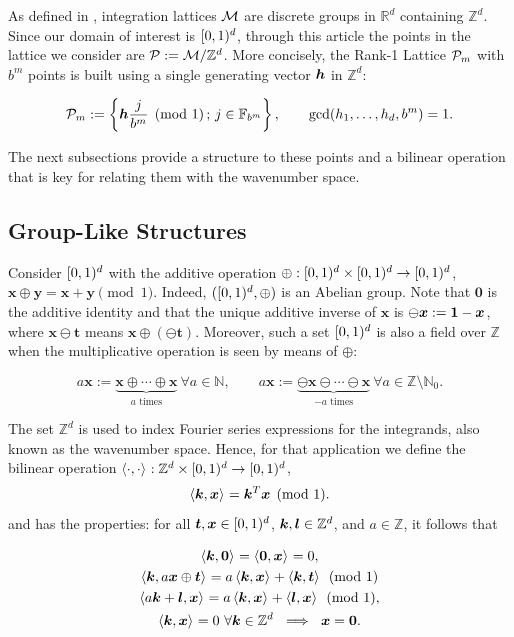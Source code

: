 \documentclass[graybox]{svmult}
\newcommand{\Z}{\mathbb{Z}} %
\newcommand{\R}{\mathbb{R}} %
\newcommand{\N}{\mathbb{N}} %
\newcommand{\F}{\mathbb{F}} %
\newcommand{\bszero}{\boldsymbol{0}} %
\newcommand{\bst}{\boldsymbol{t}}    %
\newcommand{\bsx}{\boldsymbol{x}}    %
\newcommand{\bsy}{\boldsymbol{y}}    %
\begin{document}
As defined in \cite[Sec. 2.7-2.8]{SloJoe94}, integration lattices $\mathcal{M}$ are discrete groups in $\R^d$ containing $\Z^d$. Since our domain of interest is $[0,1)^d$, through this article the points in the lattice we consider are $\cp:=\cm/\Z^d$. More concisely, the Rank-1 Lattice $\mathcal{P}_m$ with $b^m$ points is built using a single generating vector $\boldsymbol{h}$ in $\Z^d$:

\begin{equation}\label{latdef}
\cp_m :=\left\{\bsh\frac{j}{b^m}\pmod 1\, ;\, j\in\F_{b^m}\right\},\qquad \gcd(h_1,\dots,h_d,b^m)=1.
\end{equation}

The next subsections provide a structure to these points and a bilinear operation that is key for relating them with the wavenumber space.

\subsection{Group-Like Structures}
Consider $[0,1)^d$ with the additive operation $\oplus:[0,1)^d \times [0,1)^d \to [0,1)^d$, $\bsx\oplus\bsy=\bsx+\bsy\pmod 1$. Indeed, $([0,1)^d,\oplus)$ is an Abelian group. Note that $\bszero$ is the additive identity and that the unique additive inverse of $\bsx$ is $\ominus \bsx:=\bold{1}-\bsx$, where $\bsx \ominus \bst$ means $\bsx \oplus (\ominus \bst)$. Moreover, such a set $[0,1)^d$ is also a field over $\Z$ when the multiplicative operation is seen by means of $\oplus$:

\[
a \bsx:=\underbrace{\bsx \oplus \cdots \oplus \bsx}_{a \text{ times}}\ \forall a \in \N, \qquad a \bsx:=\underbrace{\ominus\bsx \ominus \cdots \ominus \bsx}_{-a \text{ times}}\ \forall a \in \Z\setminus\N_0.
\]
 
The set $\Z^d$ is used to index Fourier series expressions for the integrands, also known as the wavenumber space. Hence, for that application we define the bilinear operation $\ip{\cdot}{\cdot}: \Z^d \times \cube \to \cube$, 
\begin{equation}\label{bilinear}
\ip{\bsk}{\bsx}=\bsk^T\bsx\pmod 1.
\end{equation}
and has the properties: for all $\bst, \bsx \in \cube$, $\bsk, \bsl \in \Z^d$, and $a \in \Z$, it follows that

\begin{subequations}
\begin{gather}
\ip{\bsk}{\bszero} = \ip{\bszero}{\bsx} = 0,\\
\ip{\bsk}{a \bsx \oplus \bst} = a\ip{\bsk}{\bsx} + \ip{\bsk}{\bst} \pmod 1 \label{bilinearlinxprop} \\
\ip{a \bsk + \bsl}{\bsx} = a\ip{\bsk}{\bsx} + \ip{\bsl}{\bsx} \pmod 1, \label{bilinearlinkprop}\\
\ip{\bsk}{\bsx} = 0 \ \forall \bsk \in \Z^d \ \implies \ \bsx=\bszero.\label{bilinearlinzeroprop}
\end{gather}
\end{subequations}
\end{document}
